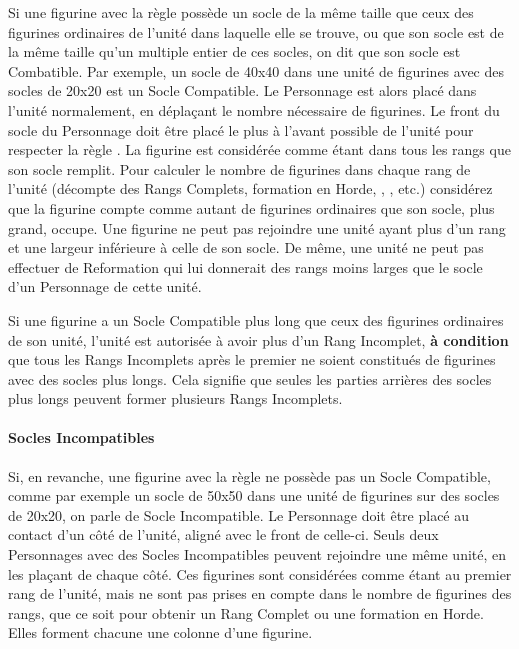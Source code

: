 Si une figurine avec la règle \frontrank{} possède un socle de la même taille que ceux des figurines ordinaires de l'unité dans laquelle elle se trouve, ou que son socle est de la même taille qu'un multiple entier de ces socles, on dit que son socle est Combatible. Par exemple, un socle de \unit{40x40}{\milli\meter} dans une unité de figurines avec des socles de \unit{20x20}{\milli\meter} est un Socle Compatible. Le Personnage est alors placé dans l'unité normalement, en déplaçant le nombre nécessaire de figurines. Le front du socle du Personnage doit être placé le plus à l'avant possible de l'unité pour respecter la règle \frontrank{}. La figurine est considérée comme étant dans tous les rangs que son socle remplit. Pour calculer le nombre de figurines dans chaque rang de l'unité (décompte des Rangs Complets, formation en Horde, \areaattack{}, \penetrating{}, etc.) considérez que la figurine compte comme autant de figurines ordinaires que son socle, plus grand, occupe. Une figurine ne peut pas rejoindre une unité ayant plus d'un rang et une largeur inférieure à celle de son socle. De même, une unité ne peut pas effectuer de Reformation qui lui donnerait des rangs moins larges que le socle d'un Personnage de cette unité.

Si une figurine a un Socle Compatible plus long que ceux des figurines ordinaires de son unité, l'unité est autorisée à avoir plus d'un Rang Incomplet, \textbf{à condition} que tous les Rangs Incomplets après le premier ne soient constitués de figurines avec des socles plus longs. Cela signifie que seules les parties arrières des socles plus longs peuvent former plusieurs Rangs Incomplets.

\paragraph{Socles Incompatibles}

Si, en revanche, une figurine avec la règle \frontrank{} ne possède pas un Socle Compatible, comme par exemple un socle de \unit{50x50}{\milli\meter} dans une unité de figurines sur des socles de \unit{20x20}{\milli\meter}, on parle de Socle Incompatible. Le Personnage doit être placé au contact d'un côté de l'unité, aligné avec le front de celle-ci. Seuls deux Personnages avec des Socles Incompatibles peuvent rejoindre une même unité, en les plaçant de chaque côté. Ces figurines sont considérées comme étant au premier rang de l'unité, mais ne sont pas prises en compte dans le nombre de figurines des rangs, que ce soit pour obtenir un Rang Complet ou une formation en Horde. Elles forment chacune une colonne d'une figurine.

